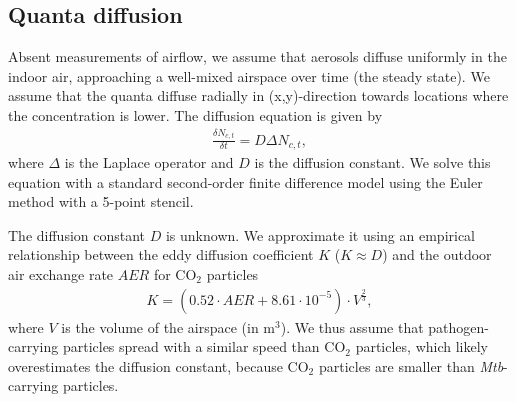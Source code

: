 \documentclass[fleqn,11pt]{wlscirep_supp}
\begin{document}
\subsection{Quanta diffusion}\label{sec:quanta-diffusion}

Absent measurements of airflow, we assume that aerosols diffuse uniformly in the indoor air, approaching a well-mixed airspace over time (the steady state). We assume that the quanta diffuse radially in (x,y)-direction towards locations where the concentration is lower. The diffusion equation is given by 
\begin{align}\label{eq:diffusion}
    \frac{\delta N_{c,t}}{\delta t} = D \Delta N_{c,t},
\end{align}
where $\Delta$ is the Laplace operator and $D$ is the diffusion constant. We solve this equation with a standard second-order finite difference model using the Euler method with a 5-point stencil. 

The diffusion constant $D$ is unknown. We approximate it using an empirical relationship between the eddy diffusion coefficient $K$ ($K \approx D$) and the outdoor air exchange rate $AER$ for CO$_2$ particles\cite{Cheng2011EnvSciTech,Foat2020BE}
\begin{align}
    K = (0.52 \cdot AER + 8.61\cdot10^{-5}) \cdot V^{\frac{2}{3}},
\end{align}
where $V$ is the volume of the airspace (in m$^3$). We thus assume that pathogen-carrying particles spread with a similar speed than CO$_2$ particles, which likely overestimates the diffusion constant, because CO$_2$ particles are smaller than \emph{Mtb}-carrying particles.
\end{document}
